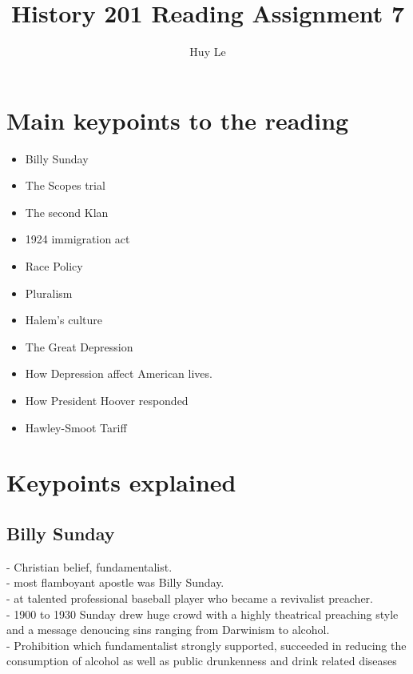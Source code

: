 \documentclass{article}
\begin{document}
\author{Huy Le}
\title{History 201 Reading Assignment 7}
\maketitle
\section{Main keypoints to the reading}
\begin{itemize}
  \item Billy Sunday
  \item The Scopes trial
  \item The second Klan
  \item 1924 immigration act
  \item Race Policy
  \item Pluralism
  \item Halem's culture
  \item The Great Depression
  \item How Depression affect American lives.
  \item How President Hoover responded
  \item Hawley-Smoot Tariff
\end{itemize}

\section{Keypoints explained}
\subsection{Billy Sunday}
- Christian belief, fundamentalist. \\
- most flamboyant apostle was Billy Sunday.\\
- at talented professional baseball player who became a revivalist preacher.\\
- 1900 to 1930 Sunday drew huge crowd with a highly theatrical preaching style
and a message denoucing sins ranging from Darwinism to alcohol. \\
- Prohibition which fundamentalist strongly supported, succeeded in reducing the consumption of alcohol as well as public drunkenness and drink related diseases\\
\end{document}
